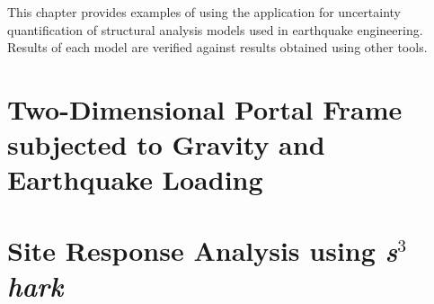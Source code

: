 This chapter provides examples of using the \texttt{\getsoftwarename{}} application for uncertainty
quantification of structural analysis models used in earthquake
engineering. Results of each model are verified against results
obtained using other tools.\\

\section{Two-Dimensional Portal Frame subjected to Gravity and Earthquake Loading}



\section{Site Response Analysis using \textit{s$^3$hark}}

